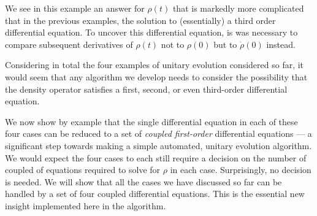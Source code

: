 We see in this example an answer for $\rho(t)$ that is markedly more complicated that in the previous examples, the solution to (essentially) a third order differential equation.  To uncover this differential equation, is was necessary to compare subsequent derivatives of $\rho(t)$ not to $\rho(0)$ but to $\dot{\rho}(0)$ instead.

Considering in total the four examples of unitary evolution considered so far, it would seem that any algorithm we develop needs to consider the possibility that the density operator satisfies a first, second, or even third-order differential equation. 

 We now show by example that the single differential equation in each of these four cases can be reduced to a set of \emph{coupled first-order} differential equations --- a significant step towards making a simple automated, unitary evolution algorithm.  We would expect the four cases to each still require a decision on the number of coupled of equations required to solve for $\rho$ in each case.  Surprisingly, no decision is needed.  We will show that all the cases we have discussed so far can be handled by a set of four coupled differential equations.  This is the essential new insight implemented here in the  algorithm. 

